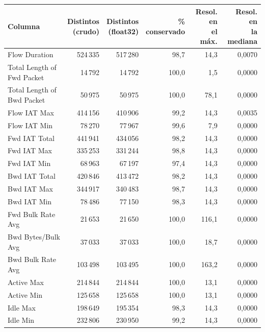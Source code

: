 \begin{tabular}{@{}lrrrrr@{}}
\toprule
Columna & \makecell{Distintos\\(crudo)} & \makecell{Distintos\\(float32)} & \makecell{\%\\conservado} & \makecell{Resol. en\\el máx.} & \makecell{Resol. en\\la mediana} \\
\midrule
Flow Duration & 524\,335 & 517\,280 & 98{,}7 & 14{,}3 & 0{,}0070 \\
Total Length of Fwd Packet & 14\,792 & 14\,792 & 100{,}0 & 1{,}5 & 0{,}0000 \\
Total Length of Bwd Packet & 50\,975 & 50\,975 & 100{,}0 & 78{,}1 & 0{,}0000 \\
Flow IAT Max & 414\,156 & 410\,906 & 99{,}2 & 14{,}3 & 0{,}0035 \\
Flow IAT Min & 78\,270 & 77\,967 & 99{,}6 & 7{,}9 & 0{,}0000 \\
Fwd IAT Total & 441\,941 & 434\,056 & 98{,}2 & 14{,}3 & 0{,}0000 \\
Fwd IAT Max & 335\,253 & 331\,244 & 98{,}8 & 14{,}3 & 0{,}0000 \\
Fwd IAT Min & 68\,963 & 67\,197 & 97{,}4 & 14{,}3 & 0{,}0000 \\
Bwd IAT Total & 420\,846 & 413\,472 & 98{,}2 & 14{,}3 & 0{,}0000 \\
Bwd IAT Max & 344\,917 & 340\,483 & 98{,}7 & 14{,}3 & 0{,}0000 \\
Bwd IAT Min & 78\,486 & 77\,150 & 98{,}3 & 14{,}3 & 0{,}0000 \\
Fwd Bulk Rate Avg & 21\,653 & 21\,650 & 100{,}0 & 116{,}1 & 0{,}0000 \\
Bwd Bytes/Bulk Avg & 37\,033 & 37\,033 & 100{,}0 & 18{,}7 & 0{,}0000 \\
Bwd Bulk Rate Avg & 103\,498 & 103\,495 & 100{,}0 & 163{,}2 & 0{,}0000 \\
Active Max & 214\,844 & 214\,844 & 100{,}0 & 13{,}1 & 0{,}0000 \\
Active Min & 125\,658 & 125\,658 & 100{,}0 & 13{,}1 & 0{,}0000 \\
Idle Max & 198\,649 & 195\,354 & 98{,}3 & 14{,}3 & 0{,}0000 \\
Idle Min & 232\,806 & 230\,950 & 99{,}2 & 14{,}3 & 0{,}0000 \\
\bottomrule
\end{tabular}
